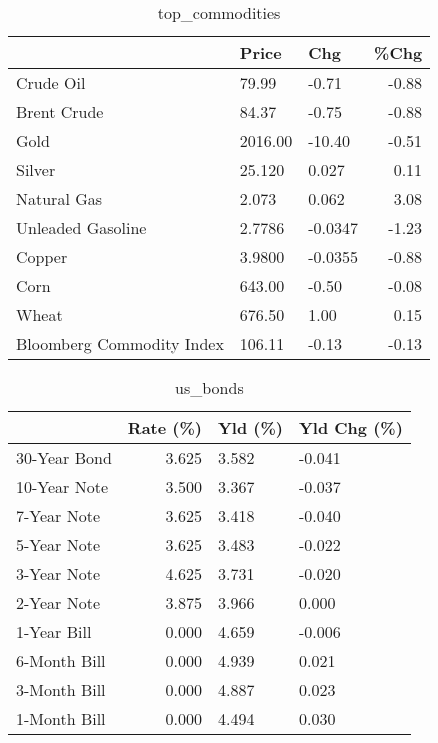 \documentclass{article}%
\begin{document}
\begin{table}[htbp]%
\caption{top\_commodities}%
\centering%
\begin{adjustbox}{width=1\textwidth}%
\begin{tabular}{lllr}
\toprule
                          &   Price &     Chg &  \%Chg \\
\midrule
               Crude Oil  &   79.99 &   -0.71 & -0.88 \\
             Brent Crude  &   84.37 &   -0.75 & -0.88 \\
                    Gold  & 2016.00 &  -10.40 & -0.51 \\
                  Silver  &  25.120 &   0.027 &  0.11 \\
             Natural Gas  &   2.073 &   0.062 &  3.08 \\
       Unleaded Gasoline  &  2.7786 & -0.0347 & -1.23 \\
                  Copper  &  3.9800 & -0.0355 & -0.88 \\
                    Corn  &  643.00 &   -0.50 & -0.08 \\
                   Wheat  &  676.50 &    1.00 &  0.15 \\
Bloomberg Commodity Index &  106.11 &   -0.13 & -0.13 \\
\bottomrule
\end{tabular}
%
\end{adjustbox}%
\end{table}

%


\begin{table}[htbp]%
\caption{us\_bonds}%
\centering%
\begin{adjustbox}{width=1\textwidth}%
\begin{tabular}{lrll}
\toprule
             &  Rate (\%) & Yld (\%) & Yld Chg (\%) \\
\midrule
30-Year Bond &     3.625 &   3.582 &      -0.041 \\
10-Year Note &     3.500 &   3.367 &      -0.037 \\
 7-Year Note &     3.625 &   3.418 &      -0.040 \\
 5-Year Note &     3.625 &   3.483 &      -0.022 \\
 3-Year Note &     4.625 &   3.731 &      -0.020 \\
 2-Year Note &     3.875 &   3.966 &       0.000 \\
 1-Year Bill &     0.000 &   4.659 &      -0.006 \\
6-Month Bill &     0.000 &   4.939 &       0.021 \\
3-Month Bill &     0.000 &   4.887 &       0.023 \\
1-Month Bill &     0.000 &   4.494 &       0.030 \\
\bottomrule
\end{tabular}
%
\end{adjustbox}%
\end{table}
\end{document}
